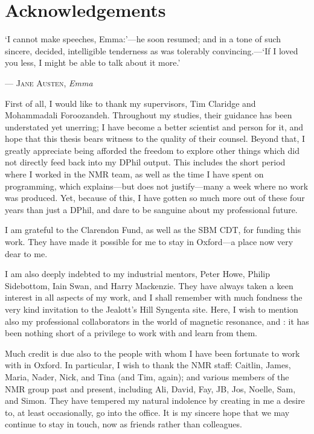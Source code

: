 \chapter{Acknowledgements}

\epigraph{\singlespacing%
`I cannot make speeches, Emma:'---he soon resumed; and in a tone of such sincere, decided, intelligible tenderness as was tolerably convincing.---`If I loved you less, I might be able to talk about it more.'
}{--- \textsc{Jane Austen}, \textit{Emma}}


First of all, I would like to thank my supervisors, Tim Claridge and Mohammadali Foroozandeh.
Throughout my studies, their guidance has been understated yet unerring; I have become a better scientist and person for it, and hope that this thesis bears witness to the quality of their counsel.
Beyond that, I greatly appreciate being afforded the freedom to explore other things which did not directly feed back into my DPhil output.
This includes the short period where I worked in the NMR team, as well as the time I have spent on programming, which explains---but does not justify---many a week where no work was produced.
Yet, because of this, I have gotten so much more out of these four years than just a DPhil, and dare to be sanguine about my professional future.

I am grateful to the Clarendon Fund, as well as the SBM CDT, for funding this work.
They have made it possible for me to stay in Oxford---a place now very dear to me.

I am also deeply indebted to my industrial mentors, Peter Howe, Philip Sidebottom, Iain Swan, and Harry Mackenzie.
They have always taken a keen interest in all aspects of my work, and I shall remember with much fondness the very kind invitation to the Jealott's Hill Syngenta site.
Here, I wish to mention also my professional collaborators in the world of magnetic resonance, \EK{} and \JND{}: it has been nothing short of a privilege to work with and learn from them.

Much credit is due also to the people with whom I have been fortunate to work with in Oxford.
In particular, I wish to thank the NMR staff: Caitlin, James, Maria, Nader, Nick, and Tina (and Tim, again); and various members of the NMR group past and present, including Ali, David, Fay, JB, Jos, Noelle, Sam, and Simon.
They have tempered my natural indolence by creating in me a desire to, at least occasionally, go into the office.
It is my sincere hope that we may continue to stay in touch, now as friends rather than colleagues.

